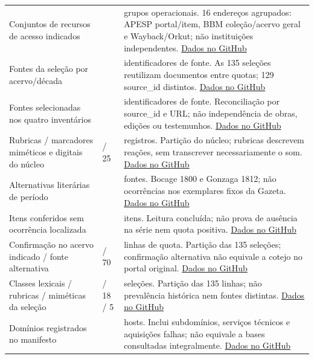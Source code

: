 \begin{longtable}{>{\raggedright\arraybackslash}p{}>{\raggedright\arraybackslash}p{}>{\raggedright\arraybackslash}p{}}
Conjuntos de recursos de acesso indicados & 13 & grupos operacionais. 16 endereços agrupados: APESP portal/item, BBM coleção/acervo geral e Wayback/Orkut; não instituições independentes. \href{https://github.com/murilloed/historia-riso-escrito-portugues/blob/main/data/base_registry.csv}{Dados no GitHub} \\
Fontes da seleção por acervo/década & 129 & identificadores de fonte. As 135 seleções reutilizam documentos entre quotas; 129 source\_id distintos. \href{https://github.com/murilloed/historia-riso-escrito-portugues/blob/main/data/evidence_register.csv}{Dados no GitHub} \\
Fontes selecionadas nos quatro inventários & 258 & identificadores de fonte. Reconciliação por source\_id e URL; não independência de obras, edições ou testemunhos. \href{https://github.com/murilloed/historia-riso-escrito-portugues/blob/main/data/consolidated_inventory.json}{Dados no GitHub} \\
Rubricas / marcadores miméticos e digitais do núcleo & 96 / 25 & registros. Partição do núcleo; rubricas descrevem reações, sem transcrever necessariamente o som. \href{https://github.com/murilloed/historia-riso-escrito-portugues/blob/main/data/consolidated_inventory.json}{Dados no GitHub} \\
Alternativas literárias de período & 2 & fontes. Bocage 1800 e Gonzaga 1812; não ocorrências nos exemplares fixos da Gazeta. \href{https://github.com/murilloed/historia-riso-escrito-portugues/blob/main/data/period_alternatives.csv}{Dados no GitHub} \\
Itens conferidos sem ocorrência localizada & 2 & itens. Leitura concluída; não prova de ausência na série nem quota positiva. \href{https://github.com/murilloed/historia-riso-escrito-portugues/blob/main/data/archive_decade_matrix.csv}{Dados no GitHub} \\
Confirmação no acervo indicado / fonte alternativa & 65 / 70 & linhas de quota. Partição das 135 seleções; confirmação alternativa não equivale a cotejo no portal original. \href{https://github.com/murilloed/historia-riso-escrito-portugues/blob/main/data/archive_decade_matrix.csv}{Dados no GitHub} \\
Classes lexicais / rubricas / miméticas da seleção & 112 / 18 / 5 & seleções. Partição das 135 linhas; não prevalência histórica nem fontes distintas. \href{https://github.com/murilloed/historia-riso-escrito-portugues/blob/main/data/consolidated_inventory.json}{Dados no GitHub} \\
Domínios registrados no manifesto & 87 & hosts. Inclui subdomínios, serviços técnicos e aquisições falhas; não equivale a bases consultadas integralmente. \href{https://github.com/murilloed/historia-riso-escrito-portugues/blob/main/data/source_domains.csv}{Dados no GitHub} \\

\end{longtable}

